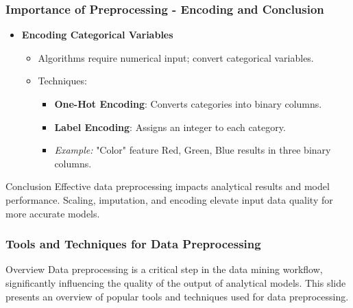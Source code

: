 \documentclass[aspectratio=169]{beamer}
\begin{document}
\begin{frame}[fragile]
    \frametitle{Importance of Preprocessing - Encoding and Conclusion}
    \begin{itemize}
        \setcounter{enumi}{4}
        \item \textbf{Encoding Categorical Variables}
        \begin{itemize}
            \item Algorithms require numerical input; convert categorical variables.
            \item Techniques:
            \begin{itemize}
                \item \textbf{One-Hot Encoding}: Converts categories into binary columns.
                \item \textbf{Label Encoding}: Assigns an integer to each category.
                \item \textit{Example:} "Color" feature {Red, Green, Blue} results in three binary columns.
            \end{itemize}
        \end{itemize}
    \end{itemize}
    
    \begin{block}{Conclusion}
        Effective data preprocessing impacts analytical results and model performance. Scaling, imputation, and encoding elevate input data quality for more accurate models.
    \end{block}
\end{frame}

\begin{frame}[fragile]
    \frametitle{Tools and Techniques for Data Preprocessing}
    \begin{block}{Overview}
        Data preprocessing is a critical step in the data mining workflow, significantly influencing the quality of the output of analytical models. This slide presents an overview of popular tools and techniques used for data preprocessing.
    \end{block}
\end{frame}
\end{document}
